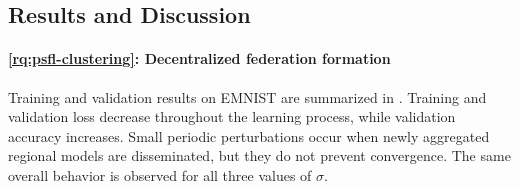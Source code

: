 \subsection{Results and Discussion}
\label{sec:psfl-results}


\paragraph{\ref{rq:psfl-clustering}: Decentralized federation formation}

Training and validation results on EMNIST are summarized in
.
%
Training and validation loss decrease throughout the learning process, while
validation accuracy increases.
%
Small periodic perturbations occur when newly aggregated regional models are
disseminated, but they do not prevent convergence.
%
The same overall behavior is observed for all three values of \(\sigma\).

